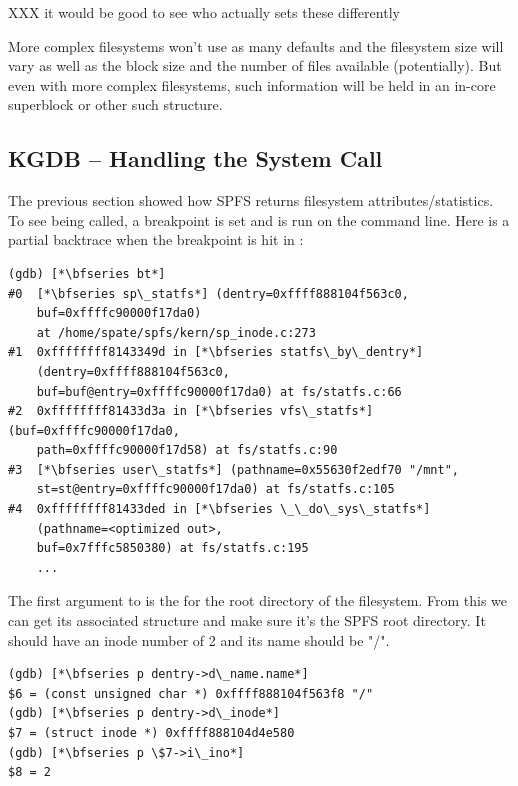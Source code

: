 \noindent
XXX it would be good to see who actually sets these differently

More complex filesystems won't use as many defaults and the filesystem size will vary as well as the block size and the number of files available (potentially). But even with more complex filesystems, such information will be held in an in-core superblock or other such structure. 


\subsection{KGDB -- Handling the  System Call}

The previous section showed how SPFS returns filesystem attributes/statistics. To see  being called, a breakpoint is set and  is run on the command line. Here is a partial backtrace when the breakpoint is hit in :

\begin{lstlisting}
(gdb) [*\bfseries bt*]
#0  [*\bfseries sp\_statfs*] (dentry=0xffff888104f563c0, 
    buf=0xffffc90000f17da0)
    at /home/spate/spfs/kern/sp_inode.c:273
#1  0xffffffff8143349d in [*\bfseries statfs\_by\_dentry*] 
    (dentry=0xffff888104f563c0, 
    buf=buf@entry=0xffffc90000f17da0) at fs/statfs.c:66
#2  0xffffffff81433d3a in [*\bfseries vfs\_statfs*] (buf=0xffffc90000f17da0, 
    path=0xffffc90000f17d58) at fs/statfs.c:90
#3  [*\bfseries user\_statfs*] (pathname=0x55630f2edf70 "/mnt", 
    st=st@entry=0xffffc90000f17da0) at fs/statfs.c:105
#4  0xffffffff81433ded in [*\bfseries \_\_do\_sys\_statfs*] 
    (pathname=<optimized out>, 
    buf=0x7fffc5850380) at fs/statfs.c:195
    ...
\end{lstlisting}

\noindent
The first argument to  is the  for the root directory of the filesystem. From this  we can get its associated  structure and make sure it's the SPFS root directory. It should have an inode number of 2 and its name should be "/".

\begin{lstlisting}
(gdb) [*\bfseries p dentry->d\_name.name*]
$6 = (const unsigned char *) 0xffff888104f563f8 "/"
(gdb) [*\bfseries p dentry->d\_inode*]
$7 = (struct inode *) 0xffff888104d4e580
(gdb) [*\bfseries p \$7->i\_ino*]
$8 = 2
\end{lstlisting}

